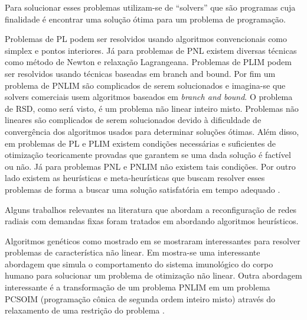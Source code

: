 Para solucionar esses problemas utilizam-se de ``solvers'' que são programas cuja finalidade é encontrar uma solução ótima para um problema de programação.

Problemas de PL podem ser resolvidos usando algoritmos convencionais como simplex e pontos interiores.
Já para problemas de PNL existem diversas técnicas como método de Newton e relaxação Lagrangeana.
Problemas de PLIM podem ser resolvidos usando técnicas baseadas em branch and bound.
Por fim um problema de PNLIM são complicados de serem solucionados e imagina-se que solvers comerciais usem algoritmos baseados em \emph{branch and bound}. 
O problema de RSD, como será visto, é um problema não linear inteiro misto.
Problemas não lineares são complicados de serem solucionados devido à dificuldade de convergência dos algoritmos usados para determinar soluções ótimas. 
Além disso, em problemas de PL e PLIM existem condições necessárias e suficientes de otimização teoricamente provadas que garantem se uma dada solução é factível ou não.
Já para problemas PNL e PNLIM não existem tais condições. Por outro lado existem as heurísticas e meta-heurísticas que buscam resolver esses problemas de forma a buscar uma solução satisfatória em tempo adequado \cite{Goncalves2013ModelosRadiais}.  


Alguns trabalhos relevantes na literatura que abordam a reconfiguração de redes radiais com demandas fixas foram tratados em \cite{Baran1989NetworkBalancing} abordando algoritmos heurísticos.

Algoritmos genéticos como mostrado em  \cite{Souza2015AlgoritmoVariaveis} se mostraram interessantes para resolver problemas de característica não linear.
Em \cite{deCastro2002AnOptimization} mostra-se uma interessante abordagem que simula o comportamento do sistema imunológico do corpo humano para solucionar um problema de otimização não linear.
Outra abordagem interessante é a transformação de um problema PNLIM em um problema PCSOIM (programação cônica de segunda ordem inteiro misto) através do relaxamento de uma restrição do problema \cite{Romais2014ReconfiguracaoMista}.